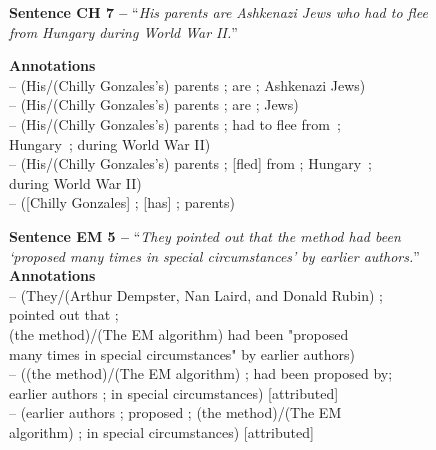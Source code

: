 \pdfoutput=1 \documentclass[11pt, a4paper]{article}
\begin{document}
\begin{figure}[htb!]
\small
\textbf{Sentence CH 7 --} ``\textit{His parents are Ashkenazi Jews who had to flee from
Hungary during World War II.}''

\smallskip\textbf{Annotations}
\\-- (His/(Chilly Gonzales's) parents ; are ; Ashkenazi Jews)
\\-- (His/(Chilly Gonzales's) parents ; are ; Jews)
\\-- ({His/(Chilly Gonzales's) parents ; had to flee from~;  \\\-\hspace{100pt} Hungary~; during World War II})
\\-- ({His/(Chilly Gonzales's) parents ; [fled] from ; Hungary~; \\\-\hspace{142pt} during World War II})
\\-- ([Chilly Gonzales] ; [has] ; parents)
\\\smallskip\hrulefill

\textbf{Sentence EM 5 --} ``\textit{They pointed out that the method had been `proposed
many times in special circumstances' by earlier authors.}''
\smallskip\\\textbf{Annotations}
\\-- (They/(Arthur Dempster, Nan Laird, and Donald Rubin) ; 
\\\-\hspace{70pt} pointed out that ; 
\\\-\hspace{15pt} (the method)/(The EM algorithm) had been "proposed
\\\-\hspace{15pt} many times in special circumstances" by earlier authors)
\\-- ((the method)/(The EM algorithm) ; had been proposed by;
\\\-\hspace{25pt} earlier authors ; in special circumstances) [attributed]
\\-- (earlier authors ; proposed ; (the method)/(The EM
\\\-\hspace{25pt} algorithm) ; in special circumstances) [attributed{]}
\\\smallskip\hrulefill


\end{figure}
\end{document}
